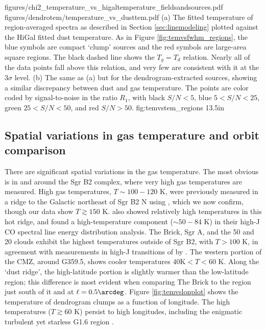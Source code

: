 \FigureTwo
{figures/chi2_temperature_vs_higaltemperature_fieldsandsources.pdf} %
{figures/dendrotem/temperature_vs_dusttem.pdf} %
{(a) The fitted temperature of region-averaged spectra as described in
Section \ref{sec:linemodeling} plotted against the HiGal fitted dust
temperature.  As in Figure \ref{fig:temvsfwhm_regions}, the blue symbols are
compact `clump' sources and the red symbols are large-area square regions.  The
black dashed line shows the $T_g = T_d$ relation.  Nearly all of the data
points fall above this relation, and very few are consistent with it at the
3$\sigma$ level.
(b) The same as (a) but for the dendrogram-extracted sources, showing a similar
discrepancy between dust and gas temperature.  The points are color coded by
signal-to-noise in the
ratio $R_1$, with black $S/N < 5$, blue $5 < S/N < 25$, green $25 < S/N < 50$,
and red $S/N > 50$.  }
{fig:temvstem_regions}
{1}{3.5in}

\subsection{Spatial variations in gas temperature and orbit comparison}
There are significant spatial variations in the gas temperature.  The most
obvious is in and around the Sgr B2 complex, where very high gas temperatures
are measured.  High gas temperatures, $T\sim100-120$ K, were previously
measured in a ridge to the Galactic northeast of Sgr B2 N using \methylcyanide
\citep[][Figure 4b]{de-Vicente1997a}, which we now confirm, though our data
show $T\gtrsim150$ K.  \citet{Ott2014a} also showed relatively high \ammonia
temperatures in this hot ridge, and \citet{Etxaluze2013a} found a
high-temperature component ($\sim50-84$ K) in their high-J CO spectral line
energy distribution analysis.
The Brick, Sgr A, and the 50 \kms and 20 \kms clouds exhibit the
highest temperatures outside of Sgr B2, with $T>100$ K, in agreement with measurements
in high-J transitions of \ammonia by \citet{Mills2013a}.  The western portion of the
CMZ, around G359.5, shows cooler temperatures $40 $K$ < T < 60$ K.  
Along the `dust ridge', the high-latitude portion is slightly warmer than the
low-latitude region; this difference is most evident when comparing The Brick
to the region just south of it and at $\ell=0.5\arcdeg$.
Figure \ref{fig:temvslonplot} shows the temperature of dendrogram clumps as a
function of longitude.  The high temperatures ($T\gtrsim60$ K) persist to high
longitudes, including the enigmatic turbulent yet starless G1.6 region
\citep{Menten2009a}.

